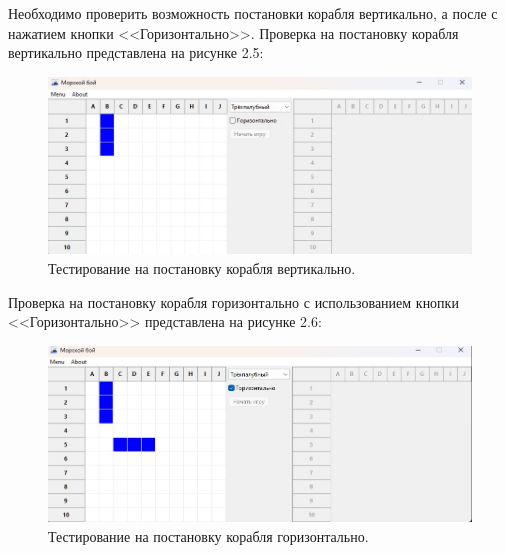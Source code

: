 Необходимо проверить возможность постановки корабля вертикально, а после с нажатием кнопки <<Горизонтально>>. Проверка на постановку корабля вертикально представлена на рисунке 2.5:
\begin{figure}[H]
\graphicspath{ {img/} }
\centering
\includegraphics[width = 15cm]{Вертикально.jpg}
\caption{Тестирование на постановку корабля вертикально.}
\end{figure}
Проверка на постановку корабля горизонтально с использованием кнопки <<Горизонтально>> представлена на рисунке 2.6:
\begin{figure}[H]
\graphicspath{ {img/} }
\centering
\includegraphics[width = 15cm]{горизонтально.jpg}
\caption{Тестирование на постановку корабля горизонтально.}
\end{figure}